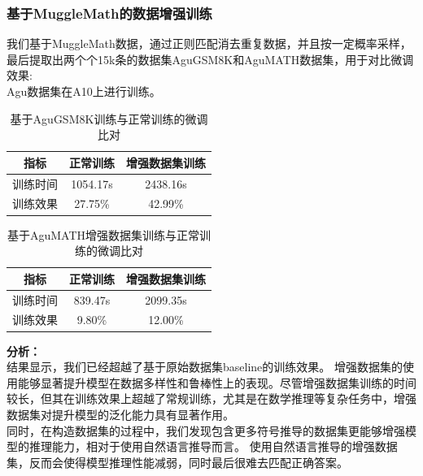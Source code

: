 \documentclass{article}
\begin{document}
\subsubsection{基于MuggleMath的数据增强训练}
我们基于MuggleMath数据，通过正则匹配消去重复数据，并且按一定概率采样，最后提取出两个个15k条的数据集AguGSM8K和AguMATH数据集，用于对比微调效果:
\\ Agu数据集在A10上进行训练。
\begin{table}[H]
  \caption{基于AguGSM8K训练与正常训练的微调比对}
  \label{gsm8k-augmentation-comparison-table}
  \centering
  \begin{tabular}{|c|c|c|}
    \hline
    \textbf{指标} & \textbf{正常训练} & \textbf{增强数据集训练} \\ \hline
    训练时间 & 1054.17s & 2438.16s \\ \hline
    训练效果 & 27.75\% & 42.99\% \\ \hline
  \end{tabular}
\end{table}


\begin{table}[H]
  \caption{基于AguMATH增强数据集训练与正常训练的微调比对}
  \label{math-augmentation-comparison-table}
  \centering
  \begin{tabular}{|c|c|c|}
    \hline
    \textbf{指标} & \textbf{正常训练} & \textbf{增强数据集训练} \\ \hline
    训练时间 & 839.47s & 2099.35s \\ \hline
    训练效果 & 9.80\% & 12.00\% \\ \hline
  \end{tabular}
\end{table}

\textbf{分析：}\\
结果显示，我们已经超越了基于原始数据集baseline的训练效果。
增强数据集的使用能够显著提升模型在数据多样性和鲁棒性上的表现。尽管增强数据集训练的时间较长，但其在训练效果上超越了常规训练，尤其是在数学推理等复杂任务中，增强数据集对提升模型的泛化能力具有显著作用。
\\
同时，在构造数据集的过程中，我们发现包含更多符号推导的数据集更能够增强模型的推理能力，相对于使用自然语言推导而言。
使用自然语言推导的增强数据集，反而会使得模型推理性能减弱，同时最后很难去匹配正确答案。
\end{document}
